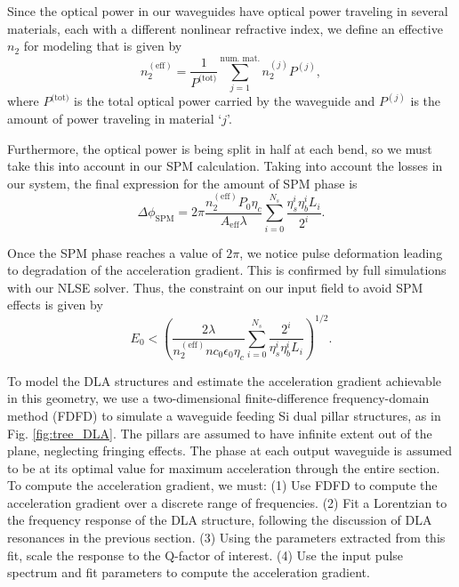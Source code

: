 Since the optical power in our waveguides have optical power traveling in several materials, each with a different nonlinear refractive index, we define an effective $n_2$ for modeling that is given by
\begin{equation}
n_2^{(\textrm{eff})} = \frac{1}{P^{\textrm{(tot)}}}\sum_{j=1}^{\textrm{num. mat.}} n_2^{(j)} P^{(j)},
\end{equation}
where $P^{\textrm{(tot)}}$ is the total optical power carried by the waveguide and $P^{(j)}$ is the amount of power traveling in material `$j$'.

Furthermore, the optical power is being split in half at each bend, so we must take this into account in our SPM calculation. Taking into account the losses in our system, the final expression for the amount of SPM phase is 
\begin{equation}
    \Delta\phi_{\textrm{SPM}} = 2\pi \frac{n_2^{(\textrm{eff})} P_0 \eta_c}{A_{\textrm{eff}}\lambda}\sum_{i=0}^{N_s}\frac{\eta_s^i\eta_b^i L_i}{2^i}.
\end{equation}

Once the SPM phase reaches a value of $2\pi$, we notice pulse deformation leading to degradation of the acceleration gradient. This is confirmed by full simulations with our NLSE solver. Thus, the constraint on our input field to avoid SPM effects is given by 
\begin{equation}
    E_0 < \left(\frac{2\lambda }{n_2^{(\textrm{eff})} n c_0 \epsilon_0 \eta_c}\sum_{i=0}^{N_s} \frac{2^i}{\eta_s^i\eta_b^i L_i} \right)^{1/2}.
\end{equation}

To model the DLA structures and estimate the acceleration gradient achievable in this geometry, we use a two-dimensional finite-difference frequency-domain method (FDFD) \cite{shin2012choice} to simulate a waveguide feeding Si dual pillar structures, as in Fig. \ref{fig:tree_DLA}. The pillars are assumed to have infinite extent out of the plane, neglecting fringing effects.  The phase at each output waveguide is assumed to be at its optimal value for maximum acceleration through the entire section.  To compute the acceleration gradient, we must: (1) Use FDFD to compute the acceleration gradient over a discrete range of frequencies. (2) Fit a Lorentzian to the frequency response of the DLA structure, following the discussion of DLA resonances in the previous section.  (3) Using the parameters extracted from this fit, scale the response to the Q-factor of interest.  (4) Use the input pulse spectrum and fit parameters to compute the acceleration gradient.


